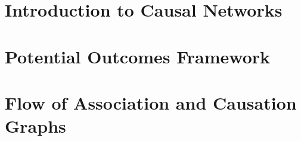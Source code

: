 \documentclass[a4paper,oneside]{book}
\begin{document}

\tableofcontents

\newpage 
\chapter{Introduction to Causal Networks}


\chapter{Potential Outcomes Framework}


\chapter{Flow of Association and Causation Graphs}

\end{document}

